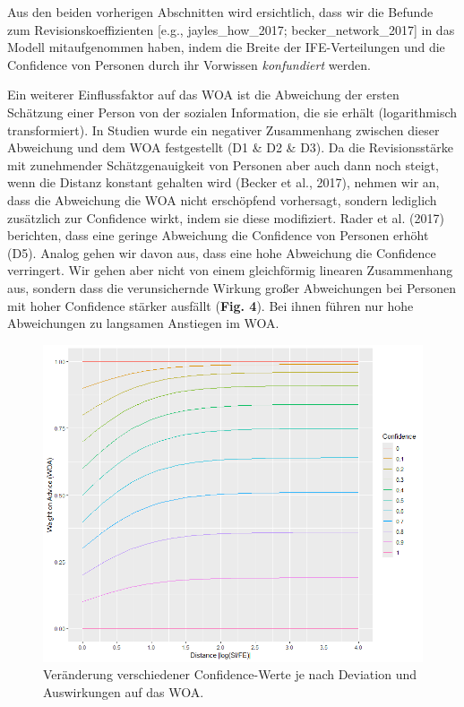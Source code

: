 \documentclass[
  man,mask,floatsintext]{apa6}
\begin{document}
Aus den beiden vorherigen Abschnitten wird ersichtlich, dass wir die Befunde zum Revisionskoeffizienten {[}e.g., jayles\_how\_2017; becker\_network\_2017{]} in das Modell mitaufgenommen haben, indem die Breite der IFE-Verteilungen und die Confidence von Personen durch ihr Vorwissen \emph{konfundiert} werden.

Ein weiterer Einflussfaktor auf das WOA ist die Abweichung der ersten Schätzung einer Person von der sozialen Information, die sie erhält (logarithmisch transformiert). In Studien wurde ein negativer Zusammenhang zwischen dieser Abweichung und dem WOA festgestellt (D1 \& D2 \& D3). Da die Revisionsstärke mit zunehmender Schätzgenauigkeit von Personen aber auch dann noch steigt, wenn die Distanz konstant gehalten wird (Becker et al., 2017), nehmen wir an, dass die Abweichung die WOA nicht erschöpfend vorhersagt, sondern lediglich zusätzlich zur Confidence wirkt, indem sie diese modifiziert. Rader et al. (2017) berichten, dass eine geringe Abweichung die Confidence von Personen erhöht (D5). Analog gehen wir davon aus, dass eine hohe Abweichung die Confidence verringert. Wir gehen aber nicht von einem gleichförmig linearen Zusammenhang aus, sondern dass die verunsichernde Wirkung großer Abweichungen bei Personen mit hoher Confidence stärker ausfällt (\textbf{Fig. 4}). Bei ihnen führen nur hohe Abweichungen zu langsamen Anstiegen im WOA.



\begin{figure}
\centering
\includegraphics{Abbildungen/base_dist_conf_woa.png}
\caption{\label{fig:my-figure4}Veränderung verschiedener Confidence-Werte je nach Deviation und Auswirkungen auf das WOA.}
\end{figure}
\end{document}
